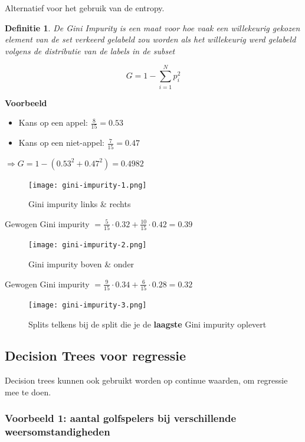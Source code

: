 \documentclass{article}
\newtheorem{theorem}{Definitie}[section]
\begin{document}
Alternatief voor het gebruik van de entropy.

\begin{theorem}
    De Gini Impurity is een maat voor hoe vaak een willekeurig
    gekozen element van de set verkeerd gelabeld zou worden als het willekeurig werd gelabeld
    volgens de distributie van de labels in de subset
\end{theorem}

\begin{equation}
    G = 1 - \sum_{i=1}^N p_i^2
\end{equation}

\textbf{Voorbeeld}

\begin{itemize}
    \item Kans op een appel: $\frac{8}{15} = 0.53$
    \item Kans op een niet-appel: $\frac{7}{15} = 0.47$
\end{itemize}

$\Rightarrow G = 1 - (0.53^2 + 0.47^2) = 0.4982$

\begin{figure}[H]
    \centering
    \texttt{[image: gini-impurity-1.png]}
    \caption{Gini impurity links \& rechts}
\end{figure}

Gewogen Gini impurity $= \frac{5}{15} \cdot 0.32 + \frac{10}{15}\cdot 0.42 = 0.39$

\begin{figure}[H]
    \centering
    \texttt{[image: gini-impurity-2.png]}
    \caption{Gini impurity boven \& onder}
\end{figure}

Gewogen Gini impurity $= \frac{9}{15} \cdot 0.34 + \frac{6}{15}\cdot 0.28 = 0.32$

\begin{figure}[H]
    \centering
    \texttt{[image: gini-impurity-3.png]}
    \caption{Splits telkens bij de split die je de \textbf{laagste} Gini impurity oplevert}
\end{figure}

\subsection{Decision Trees voor regressie}

Decision trees kunnen ook gebruikt worden op continue waarden, om regressie mee te doen.

\subsubsection{Voorbeeld 1: aantal golfspelers bij verschillende weersomstandigheden}
\end{document}
